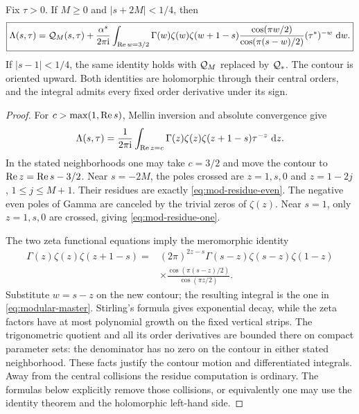 \begin{theorem}\label{thm:modular}
Fix \(\tau>0\). If \(M\geq0\) and \(|s+2M|<1/4\), then
\begin{equation}\label{eq:modular-master}
 \boxed{\displaystyle
 \Lambda(s,\tau)={\cal Q}_M(s,\tau)
  +\frac{\alpha^s}{2\pi\mathrm i}
   \int_{\operatorname{Re} w=3/2}
       \Gamma(w)\zeta(w)\zeta(w+1-s)
       \frac{\cos(\pi w/2)}{\cos(\pi(s-w)/2)}
       (\tau^*)^{-w}\,\,\mathrm d w.}
\end{equation}
If \(|s-1|<1/4\), the same identity holds with
\({\cal Q}_M\) replaced by \({\cal Q}_*\).
The contour is oriented upward. Both identities are holomorphic
through their central orders, and the integral admits every fixed
order derivative under its sign.
\end{theorem}

\begin{proof}
For \(c>\max(1,\operatorname{Re} s)\), Mellin inversion and absolute convergence
give
\begin{equation}\label{eq:lambert-mellin}
 \Lambda(s,\tau)=\frac1{2\pi\mathrm i}
       \int_{\operatorname{Re} z=c}\Gamma(z)\zeta(z)\zeta(z+1-s)
                                  \tau^{-z}\,\,\mathrm d z.
\end{equation}
In the stated neighborhoods one may take \(c=3/2\) and move the
contour to \(\operatorname{Re} z=\operatorname{Re} s-3/2\).
Near \(s=-2M\), the poles crossed are \(z=1,s,0\) and
\(z=1-2j\), \(1\leq j\leq M+1\). Their residues are exactly
\eqref{eq:mod-residue-even}. The negative even poles of Gamma
are canceled by the trivial zeros of \(\zeta(z)\).
Near \(s=1\), only \(z=1,s,0\) are crossed, giving
\eqref{eq:mod-residue-one}.

The two zeta functional equations \cite[Section 25.4]{DLMF} imply
the meromorphic identity
\begin{equation}\label{eq:mod-functional-factor}
 \begin{split}
 \Gamma(z)\zeta(z)\zeta(z+1-s)
  ={}&(2\pi)^{2z-s}\Gamma(s-z)\zeta(s-z)\zeta(1-z)\\
 &\times
 \frac{\cos(\pi(s-z)/2)}{\cos(\pi z/2)}.
 \end{split}
\end{equation}
Substitute \(w=s-z\) on the new contour; the resulting integral
is the one in \eqref{eq:modular-master}.
Stirling's formula gives exponential decay, while the zeta
factors have at most polynomial growth on the fixed vertical
strips. The trigonometric quotient and all its order derivatives
are bounded there on compact parameter sets: the denominator has
no zero on the contour in either stated neighborhood. These facts
justify the contour motion and differentiated integrals.
Away from the central collisions the residue computation is
ordinary. The formulas below explicitly remove those collisions,
or equivalently one may use the identity theorem and the
holomorphic left-hand side.
\end{proof}

